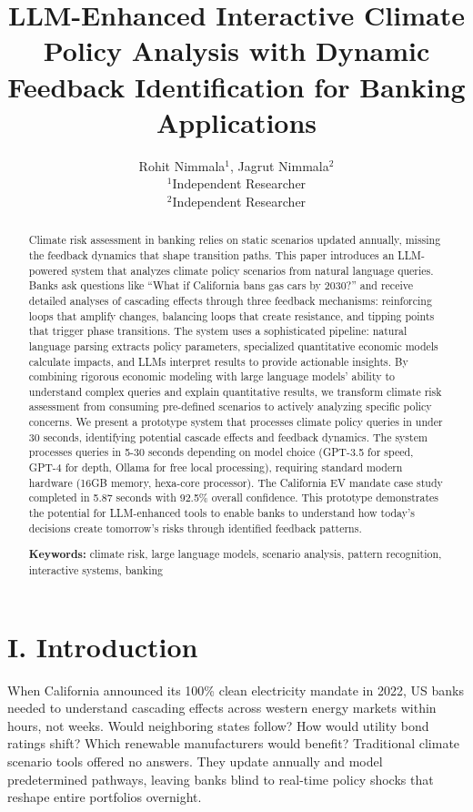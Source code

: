 \documentclass[10pt,twocolumn]{article}
\title{LLM-Enhanced Interactive Climate Policy Analysis with Dynamic Feedback Identification for Banking Applications}
\author{
Rohit Nimmala$^1$, Jagrut Nimmala$^2$\\
$^1$Independent Researcher\\
$^2$Independent Researcher
}
\date{}
\begin{document}
\maketitle

\begin{abstract}
Climate risk assessment in banking relies on static scenarios updated annually, missing the feedback dynamics that shape transition paths. This paper introduces an LLM-powered system that analyzes climate policy scenarios from natural language queries. Banks ask questions like ``What if California bans gas cars by 2030?'' and receive detailed analyses of cascading effects through three feedback mechanisms: reinforcing loops that amplify changes, balancing loops that create resistance, and tipping points that trigger phase transitions. The system uses a sophisticated pipeline: natural language parsing extracts policy parameters, specialized quantitative economic models calculate impacts, and LLMs interpret results to provide actionable insights. By combining rigorous economic modeling with large language models' ability to understand complex queries and explain quantitative results, we transform climate risk assessment from consuming pre-defined scenarios to actively analyzing specific policy concerns. We present a prototype system that processes climate policy queries in under 30 seconds, identifying potential cascade effects and feedback dynamics. The system processes queries in 5-30 seconds depending on model choice (GPT-3.5 for speed, GPT-4 for depth, Ollama for free local processing), requiring standard modern hardware (16GB memory, hexa-core processor). The California EV mandate case study completed in 5.87 seconds with 92.5\% overall confidence. This prototype demonstrates the potential for LLM-enhanced tools to enable banks to understand how today's decisions create tomorrow's risks through identified feedback patterns.

\textbf{Keywords:} climate risk, large language models, scenario analysis, pattern recognition, interactive systems, banking
\end{abstract}

\section{I. Introduction}
When California announced its 100\% clean electricity mandate in 2022, US banks needed to understand cascading effects across western energy markets within hours, not weeks. Would neighboring states follow? How would utility bond ratings shift? Which renewable manufacturers would benefit? Traditional climate scenario tools offered no answers. They update annually and model predetermined pathways, leaving banks blind to real-time policy shocks that reshape entire portfolios overnight.
\end{document}
